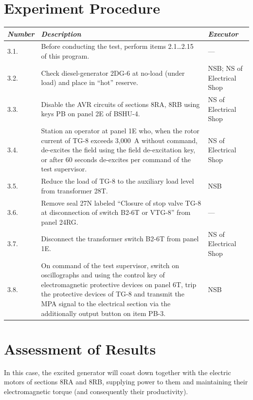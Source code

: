 \documentclass[openright]{bookest}
\begin{document}
\section*{Experiment Procedure}

\small\begin{center}
  \begin{longtable}{|p{3em}|p{20em}|p{7em}|}
    \hline
    \textit{Number} & \textit{Description} & \textit{Executor} \\
    \hline
    3.1. & Before conducting the test, perform items 2.1\ldots 2.15 of this program. & --- \\
    \hline
    3.2. & Check diesel-generator 2DG-6 at no-load (under load) and place in ``hot'' reserve. & NSB; NS of Electrical Shop \\
    \hline
    3.3. & Disable the AVR circuits of sections 8RA, 8RB using keys PB on panel 2E of BSHU-4. & NS of Electrical Shop \\
    \hline
    3.4. & Station an operator at panel 1E who, when the rotor current of TG-8 exceeds 3,000~A without command, de-excites the field using the field de-excitation key, or after 60 seconds de-excites per command of the test supervisor. & NS of Electrical Shop \\
    \hline
    3.5. & Reduce the load of TG-8 to the auxiliary load level from transformer 28T. & NSB \\
    \hline
    3.6. & Remove seal 27N labeled ``Closure of stop valve TG-8 at disconnection of switch B2-6T or VTG-8'' from panel 24RG. & --- \\
    \hline
    3.7. & Disconnect the transformer switch B2-6T from panel 1E. & NS of Electrical Shop \\
    \hline
    3.8. & On command of the test supervisor, switch on oscillographs and using the control key of electromagnetic protective devices on panel 6T, trip the protective devices of TG-8 and transmit the MPA signal to the electrical section via the additionally output button on item PB-3. & NSB \\
    \hline
  \end{longtable}
\end{center}\normalsize

\section*{Assessment of Results}

In this case, the excited generator will coast down together with the electric motors of sections 8RA and 8RB, supplying power to them and maintaining their electromagnetic torque (and consequently their productivity).
\end{document}
